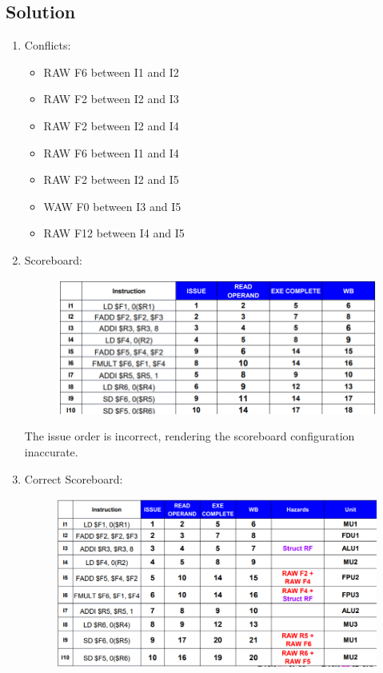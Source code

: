 \subsection*{Solution}
\begin{enumerate}
    \item Conflicts:
        \begin{itemize}
        \item RAW F6 between I1 and I2
        \item RAW F2 between I2 and I3
        \item RAW F2 between I2 and I4
        \item RAW F6 between I1 and I4
        \item RAW F2 between I2 and I5
        \item WAW F0 between I3 and I5
        \item RAW F12 between I4 and I5
        \end{itemize}
    \item Scoreboard:
        \begin{figure}[H]
            \centering
            \includegraphics[width=1\linewidth]{images/score2.png}
        \end{figure}
        The issue order is incorrect, rendering the scoreboard configuration inaccurate.
    \item Correct Scoreboard:
        \begin{figure}[H]
            \centering
            \includegraphics[width=1\linewidth]{images/score3.png}
        \end{figure}
\end{enumerate}